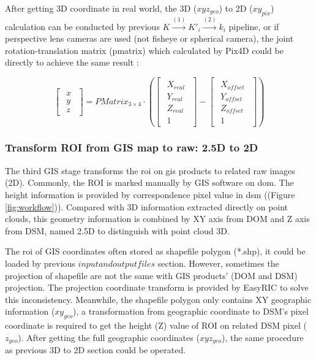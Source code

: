 \documentclass{configs/bmcart}
\begin{document}
After getting 3D coordinate in real world, the 3D ($xyz_{geo}$) to 2D ($xy_{pix}$) calculation can be conducted by previous $K \xrightarrow{(1)} K'_i \xrightarrow{(2)} k_i$ pipeline, or if perspective lens cameras are used (not fisheye or spherical camera), the joint rotation-translation matrix (pmatrix) which calculated by Pix4D could be directly to achieve the same result \cite{pix4d_support_what_2020}:

$$
\begin{bmatrix}\begin{matrix} x \\ y \\ z\end{matrix}\end{bmatrix}
= PMatrix_{3\times4} \cdot 
\left(\begin{bmatrix}\begin{matrix} 
  X_{real} \\ Y_{real} \\ Z_{real} \\ 1
\end{matrix}\end{bmatrix} 
- 
\begin{bmatrix}\begin{matrix} 
  X_{offset} \\ Y_{offset} \\ Z_{offset} \\ 1
\end{matrix}\end{bmatrix}
\right)
$$

\subsubsection*{Transform ROI from GIS map to raw: 2.5D to 2D}
The third GIS stage transforms the \acrshort*{roi} on \acrshort*{gis} products to related raw images (2D). Commonly, the ROI is marked manually by GIS software on \acrshort*{dom}. The height information is provided by correspondence pixel value in \acrshort*{dsm} ((Figure \ref{fig:workflow})). Compared with 3D information extracted directly on point clouds, this geometry information is combined by XY axis from DOM and Z axis from DSM, named 2.5D to distinguish with point cloud 3D. 

The \acrshort*{roi} of GIS coordinates often stored as shapefile polygon (*.shp), it could be loaded by previous $input and output files$ section. However, sometimes the projection of shapefile are not the same with GIS products' (DOM and DSM) projection. The projection coordinate transform is provided by EasyRIC to solve this inconsistency. Meanwhile, the shapefile polygon only contains XY geographic information ($xy_{geo}$), a transformation from geographic coordinate to DSM's pixel coordinate is required to get the height (Z) value of ROI on related DSM pixel ($z_{geo}$). After getting the full geographic coordinates ($xyz_{geo}$), the same procedure as previous 3D to 2D section could be operated.
\end{document}
